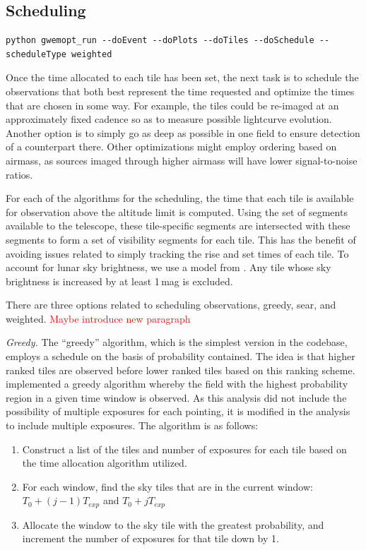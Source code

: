 \documentclass[twocolumn]{aastex62}
\begin{document}
\subsection{Scheduling}
\label{subsection:scheduling}
\begin{lstlisting}
python gwemopt_run --doEvent --doPlots --doTiles --doSchedule --scheduleType weighted
\end{lstlisting}
Once the time allocated to each tile has been set, the next task is to schedule the observations that both best represent the time requested and optimize the times that are chosen in some way. 
For example, the tiles could be re-imaged at an approximately fixed cadence so as to measure possible lightcurve evolution.
Another option is to simply go as deep as possible in one field to ensure detection of a counterpart there.
Other optimizations might employ ordering based on airmass, as sources imaged through higher airmass will have lower signal-to-noise ratios.

For each of the algorithms for the scheduling, the time that each tile is available for observation above the altitude limit is computed.
Using the set of segments available to the telescope, these tile-specific segments  are intersected with these segments to form a set of visibility segments for each tile.
This has the benefit of avoiding issues related to simply tracking the rise and set times of each tile.
To account for lunar sky brightness, we use a model from \cite{CoSt2016b}. 
Any tile whose sky brightness is increased by at least 1\,mag is excluded.

There are three options related to scheduling observations, greedy, sear, and weighted.
\textcolor{red}{Maybe introduce new paragraph}

\emph{Greedy.} The ``greedy'' algorithm, which is the simplest version in the codebase, employs a schedule on the basis of probability contained. The idea is that higher ranked tiles are observed before lower ranked tiles based on this ranking scheme. \cite{RaSi2017} implemented a greedy algorithm whereby the field with the highest probability region in a given time window is observed. As this analysis did not include the possibility of multiple exposures for each pointing, it is modified in the analysis to include multiple exposures. The algorithm is as follows:

\begin{enumerate}
\item Construct a list of the tiles and number of exposures for each tile based on the time allocation algorithm utilized.
\item For each window, find the sky tiles that are in the current window: $T_0 + (j-1) T_{exp}$ and $T_0 + j T_{exp}$
\item Allocate the window to the sky tile with the greatest probability, and increment the number of exposures for that tile down by 1.
\end{enumerate}
\end{document}
